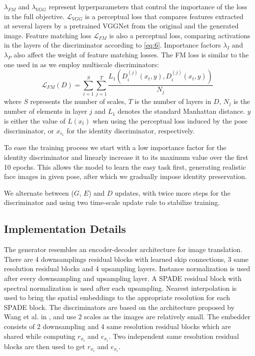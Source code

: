 \documentclass[11pt,a4paper]{article}
\begin{document}
$\lambda_{FM}$ and $\lambda_{VGG}$ represent hyperparameters that control the importance of the loss in the full objective. $\mathcal{L}_{VGG}$ is a perceptual loss that compares features extracted at several layers by a pretrained VGGNet \cite{simonyan2014very} from the original and the generated image.
Feature matching loss $\mathcal{L}_{FM}$ is also a perceptual loss, comparing activations in the layers of the discriminator according to \eqref{eq:6}. Importance factors $\lambda_I$ and $\lambda_P$ also affect the weight of feature matching losses. The FM loss is similar to the one used in \cite{wang2018pix2pixHD} as we employ multiscale discriminators:
\begin{equation}
    \mathcal{L}_{FM}(D) = \sum_{i=1}^{S}\sum_{j=1}^{T}\frac{L_1(D_i^{(j)}(x_t, y), D_i^{(j)}(\hat{x}_t, y))}{N_j}
    \label{eq:6}
\end{equation}
where $S$ represents the number of scales, $T$ is the number of layers in $D$, $N_j$ is the number of elements in layer $j$ and $L_1$ denotes the standard Manhattan distance. $y$ is either the value of $L(x_t)$ when using the perceptual loss induced by the pose discriminator, or $x_{i_1}$ for the identity discriminator, respectively.

To ease the training process we start with a low importance factor for the identity discriminator and linearly increase it to its maximum value over the first 10 epochs. This allows the model to learn the easy task first, generating realistic face images in given pose, after which we gradually impose identity preservation.

We alternate between ($G$, $E$) and $D$ updates, with twice more steps for the discriminator and using two time-scale update rule \cite{heusel2017gans} to stabilize training.  

\subsection{Implementation Details}
\label{sec:implementation}
The generator resembles an encoder-decoder architecture for image translation. There are 4 downsamplings residual blocks with learned skip connections, 3 same resolution residual blocks and 4 upsampling layers. Instance normalization \cite{ulyanov2016instance} is used after every downsampling and upsampling layer. A SPADE residual block with spectral normalization \cite{miyato2018spectral,zhang2019self} is used after each upsampling. Nearest interpolation is used to bring the spatial embeddings to the appropriate resolution for each SPADE block. The discriminators are based on the architecture proposed by Wang et al. in \cite{wang2018pix2pixHD}, and use 2 scales as the images are relatively small. The embedder consists of 2 downsampling and 4 same resolution residual blocks which are shared while computing $r_{x_i}$ and ${e_{x_i}}$. Two independent same resolution residual blocks are then used to get $r_{x_i}$ and ${e_{x_i}}$.
\end{document}
